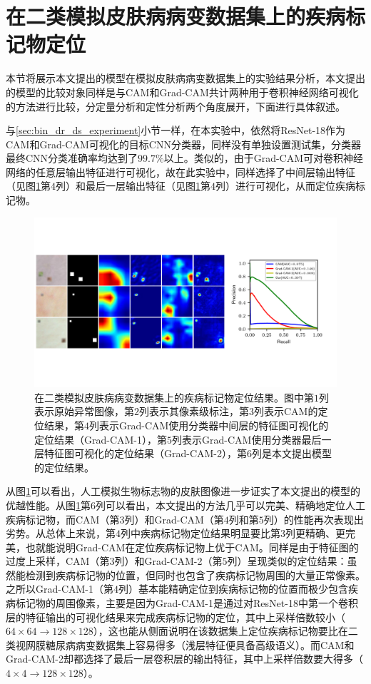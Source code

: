 \section{在二类模拟皮肤病病变数据集上的疾病标记物定位}\label{sec:bin_simulated_ds_experiment}
本节将展示本文提出的模型在模拟皮肤病病变数据集上的实验结果分析，本文提出的模型的比较对象同样是与CAM和Grad-CAM共计两种用于卷积神经网络可视化的方法进行比较，分定量分析和定性分析两个角度展开，下面进行具体叙述。

与\ref{sec:bin_dr_ds_experiment}小节一样，在本实验中，依然将ResNet-18作为CAM和Grad-CAM可视化的目标CNN分类器，同样没有单独设置测试集，分类器最终CNN分类准确率均达到了$99.7\%$以上。类似的，由于Grad-CAM可对卷积神经网络的任意层输出特征进行可视化，故在此实验中，同样选择了中间层输出特征（见图\ref{fig:simulated_skin}第$4$列）和最后一层输出特征（见图\ref{fig:simulated_skin}第$4$列）进行可视化，从而定位疾病标记物。
\begin{figure}[h]
	\centering
	\includegraphics[width=1.0\textwidth]{figure/pr_curve_skin_image.pdf}
	\caption{在二类模拟皮肤病病变数据集上的疾病标记物定位结果。图中第$1$列表示原始异常图像，第$2$列表示其像素级标注，第$3$列表示CAM的定位结果，第$4$列表示Grad-CAM使用分类器中间层的特征图可视化的定位结果（Grad-CAM-1），第$5$列表示Grad-CAM使用分类器最后一层特征图可视化的定位结果（Grad-CAM-2），第$6$列是本文提出模型的定位结果。} 
	\label{fig:simulated_skin}
\end{figure}

\noindent 从图\ref{fig:simulated_skin}可以看出，人工模拟生物标志物的皮肤图像进一步证实了本文提出的模型的优越性能。从图\ref{fig:simulated_skin}第$6$列可以看出，本文提出的方法几乎可以完美、精确地定位人工疾病标记物，而CAM（第$3$列）和Grad-CAM（第$4$列和第$5$列）的性能再次表现出劣势。从总体上来说，第$4$列中疾病标记物定位结果明显要比第$3$列更精确、更完美，也就能说明Grad-CAM在定位疾病标记物上优于CAM。同样是由于特征图的过度上采样，CAM（第$3$列）和Grad-CAM-2（第$5$列）呈现类似的定位结果：虽然能检测到疾病标记物的位置，但同时也包含了疾病标记物周围的大量正常像素。之所以Grad-CAM-1（第$4$列）基本能精确定位到疾病标记物的位置而极少包含疾病标记物的周围像素，主要是因为Grad-CAM-1是通过对ResNet-18中第一个卷积层的特征输出的可视化结果来完成疾病标记物的定位，其中上采样倍数较小（$64\times 64\rightarrow 128\times 128$），这也能从侧面说明在该数据集上定位疾病标记物要比在二类视网膜糖尿病病变数据集上容易得多（浅层特征便具备高级语义）。而CAM和Grad-CAM-2却都选择了最后一层卷积层的输出特征，其中上采样倍数要大得多（$4\times4\rightarrow 128\times 128$）。

